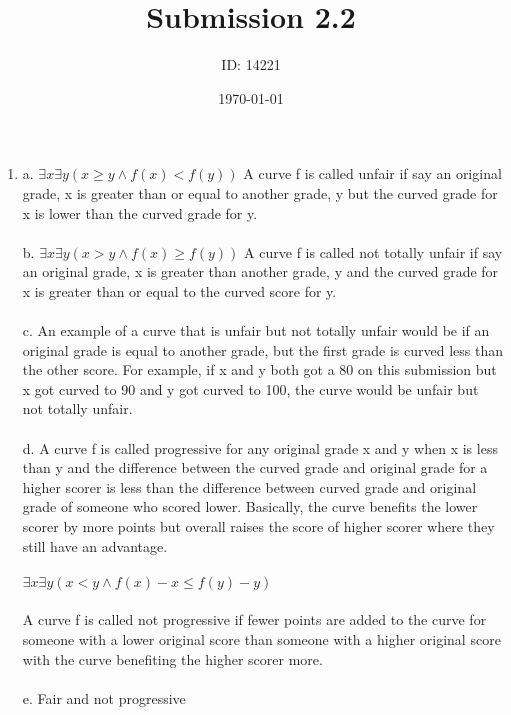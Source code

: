 \documentclass[]{article}
\date{\today}
\author{ID: 14221}
\title{Submission 2.2}
\begin{document}
\maketitle

\begin{enumerate}
    \item a.
    \newline $\exists x \exists y (x\geq y \land f(x)<f(y))$
    \newline A curve f is called unfair if say an original grade, x is greater than or equal to another grade, y but the curved grade for x is lower than the curved grade for y.
    \\\\ b.
    \newline $\exists x \exists y(x>y \land f(x)\geq f(y))$
    \newline A curve f is called not totally unfair if say an original grade, x is greater than another grade, y and the curved grade for x is greater than or equal to the curved score for y.
     \newline
    \\\\ c. An example of a curve that is unfair but not totally unfair would be if an original grade is equal to another grade, but the first grade is curved less than the other score. For example, if x and y both got a 80 on this submission but x got curved to 90 and y got curved to 100, the curve would be unfair but not totally unfair.
    \\\\ d.
    \newline A curve f is called progressive for any original grade x and y when x is less than y and the difference between the curved grade and original grade for a higher scorer is less than the difference between curved grade and original grade of someone who scored lower. Basically, the curve benefits the lower scorer by more points but overall raises the score of higher scorer where they still have an advantage.
    \\\\ $\exists x \exists y(x<y \land f(x)-x \leq f(y)-y)$
    \\\\ A curve f is called not progressive if fewer points are added to the curve for someone with a lower original score than someone with a higher original score with the curve benefiting the higher scorer more.
    \\\\ e. Fair and not progressive
    

\end{enumerate}
\end{document}
